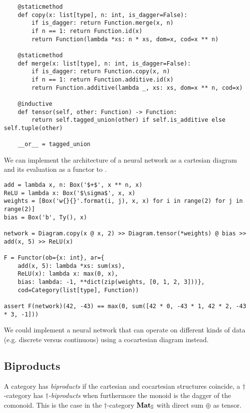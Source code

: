 \begin{python}
\begin{verbatim}
    @staticmethod
    def copy(x: list[type], n: int, is_dagger=False):
        if is_dagger: return Function.merge(x, n)
        if n == 1: return Function.id(x)
        return Function(lambda *xs: n * xs, dom=x, cod=x ** n)

    @staticmethod
    def merge(x: list[type], n: int, is_dagger=False):
        if is_dagger: return Function.copy(x, n)
        if n == 1: return Function.additive.id(x)
        return Function.additive(lambda _, xs: xs, dom=x ** n, cod=x)

    @inductive
    def tensor(self, other: Function) -> Function:
        return self.tagged_union(other) if self.is_additive else self.tuple(other)

    __or__ = tagged_union
\end{verbatim}
\end{python}

\begin{example}
We can implement the architecture of a neural network as a cartesian diagram and its evaluation as a functor to .

\begin{verbatim}
add = lambda x, n: Box('$+$', x ** n, x)
ReLU = lambda x: Box('$\sigma$', x, x)
weights = [Box('w{}{}'.format(i, j), x, x) for i in range(2) for j in range(2)]
bias = Box('b', Ty(), x)

network = Diagram.copy(x @ x, 2) >> Diagram.tensor(*weights) @ bias >> add(x, 5) >> ReLU(x)

F = Functor(ob={x: int}, ar={
    add(x, 5): lambda *xs: sum(xs),
    ReLU(x): lambda x: max(0, x),
    bias: lambda: -1, **dict(zip(weights, [0, 1, 2, 3]))},
    cod=Category(list[type], Function))

assert F(network)(42, -43) == max(0, sum([42 * 0, -43 * 1, 42 * 2, -43 * 3, -1]))
\end{verbatim}

We could implement a neural network that can operate on different kinds of data (e.g. discrete versus continuous) using a cocartesian diagram instead.
\end{example}

\subsection{Biproducts}\label{subsection:biproducts}

A category has \emph{biproducts} if the cartesian and cocartesian structures coincide,
a $\dagger$-category has \emph{$\dagger$-biproducts} when furthermore the monoid is the dagger of the comonoid.
This is the case in the $\dagger$-category $\mathbf{Mat}_\S$ with direct sum $\oplus$ as tensor.

